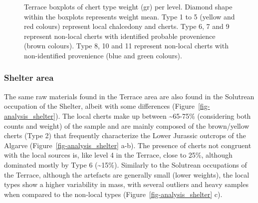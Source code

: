 \documentclass[
  a4paper,
  DIV=11,
  numbers=noendperiod]{scrreprt}
\begin{document}
\begin{figure}


\caption{\label{fig-weight}Terrace boxplots of chert type weight (gr)
per level. Diamond shape within the boxplots represents weight mean.
Type 1 to 5 (yellow and red colours) represent local chalcedony and
cherts. Type 6, 7 and 9 represent non-local cherts with identified
probable provenience (brown colours). Type 8, 10 and 11 represent
non-local cherts with non-identified provenience (blue and green
colours).}

\end{figure}%

\subsubsection{Shelter area}\label{shelter-area}

The same raw materials found in the Terrace area are also found in the
Solutrean occupation of the Shelter, albeit with some differences
(Figure~\ref{fig-analysis_shelter}). The local cherts make up between
\textasciitilde65-75\% (considering both counts and weight) of the
sample and are mainly composed of the brown/yellow cherts (Type 2) that
frequently characterize the Lower Jurassic outcrops of the Algarve
(Figure~\ref{fig-analysis_shelter} a-b). The presence of cherts not
congruent with the local sources is, like level 4 in the Terrace, close
to 25\%, although dominated mostly by Type 6 (\textasciitilde15\%).
Similarly to the Solutrean occupations of the Terrace, although the
artefacts are generally small (lower weights), the local types show a
higher variability in mass, with several outliers and heavy samples when
compared to the non-local types (Figure~\ref{fig-analysis_shelter} c).
\end{document}

